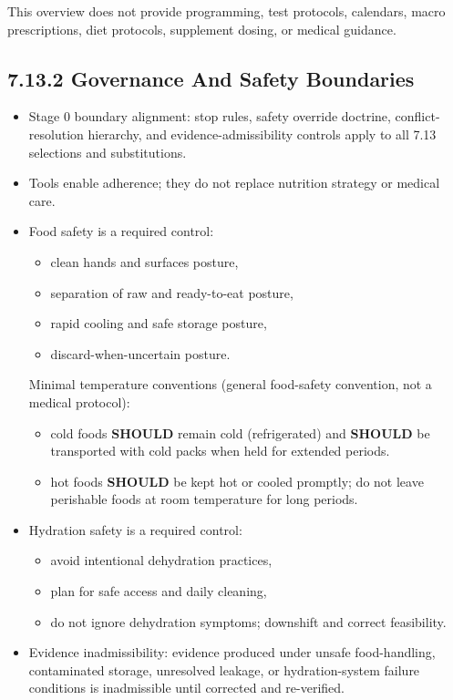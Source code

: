 \documentclass[10pt]{article}
\begin{document}
This overview does not provide programming, test protocols, calendars, macro prescriptions, diet protocols, supplement dosing, or medical guidance.

\subsection*{7.13.2 Governance And Safety Boundaries}
{}

\begin{itemize}
\item Stage 0 boundary alignment: stop rules, safety override doctrine, conflict-resolution hierarchy, and evidence-admissibility controls apply to all 7.13 selections and substitutions.
\item Tools enable adherence; they do not replace nutrition strategy or medical care.
\item Food safety is a required control:
  \begin{itemize}
  \item clean hands and surfaces posture,
  \item separation of raw and ready-to-eat posture,
  \item rapid cooling and safe storage posture,
  \item discard-when-uncertain posture.
  \end{itemize}
  Minimal temperature conventions (general food-safety convention, not a medical protocol):
  \begin{itemize}
  \item cold foods \textbf{SHOULD} remain cold (refrigerated) and \textbf{SHOULD} be transported with cold packs when held for extended periods.
  \item hot foods \textbf{SHOULD} be kept hot or cooled promptly; do not leave perishable foods at room temperature for long periods.
  \end{itemize}
\item Hydration safety is a required control:
  \begin{itemize}
  \item avoid intentional dehydration practices,
  \item plan for safe access and daily cleaning,
  \item do not ignore dehydration symptoms; downshift and correct feasibility.
  \end{itemize}
\item Evidence inadmissibility: evidence produced under unsafe food-handling, contaminated storage, unresolved leakage, or hydration-system failure conditions is inadmissible until corrected and re-verified.

\end{itemize}
\end{document}
